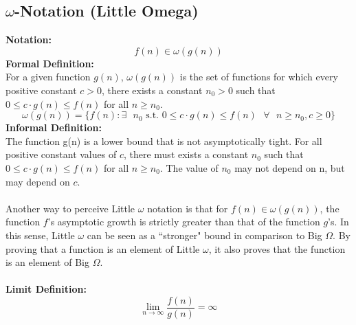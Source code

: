 \subsection{$\omega$-Notation (Little Omega)}
\textbf{Notation:}
$$
f(n) \in \omega(g(n))
$$
\textbf{Formal Definition:}\\
For a given function $g(n)$, $\omega(g(n))$ is the set  of functions for which every positive constant $c > 0$, there exists a constant $n_0 > 0$ such that $0 \leq c \cdot g(n) \leq f(n)$ for all $n \geq n_0$.
$$
\omega(g(n)) = \{ f(n) : \exists \text{ } n_0 \text{ s.t. } 0 \leq c \cdot g(n) \leq f(n) \text{ } \forall \text{ } n \geq n_0, c \geq 0 \}
$$
\textbf{Informal Definition:}\\
The function g(n) is a lower bound that is not asymptotically tight. For all positive constant values of $c$, there must exists a constant $n_0$ such that $0 \leq c \cdot g(n) \leq f(n)$ for all $n \geq n_0$. The value of $n_0$ may not depend on n, but may depend on $c$.\\\\
Another way to perceive Little $\omega$ notation is that for $f(n) \in \omega(g(n))$, the function $f$'s asymptotic growth is strictly greater than that of the function $g$'s. In this sense, Little $\omega$ can be seen as a ``stronger" bound in comparison to Big $\Omega$. By proving that a function is an element of Little $\omega$, it also proves that the function is an element of Big $\Omega$.\\\\
\textbf{Limit Definition:}
$$
\lim\limits_{n\to\infty} \frac{f(n)}{g(n)} = \infty
$$